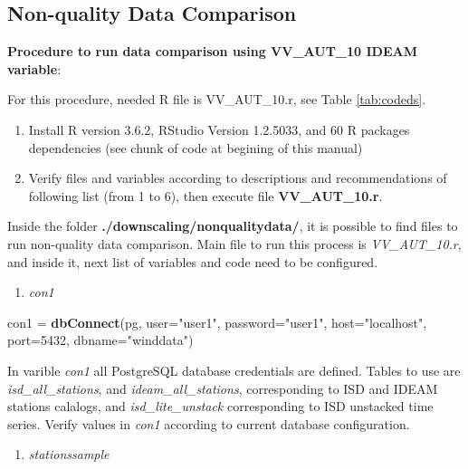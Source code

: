\documentclass[12pt,oneside]{reedthesis}
\newenvironment{Shaded}{\begin{snugshade}}{\end{snugshade}}
\newcommand{\DataTypeTok}[1]{\textcolor[rgb]{0.13,0.29,0.53}{#1}}
\newcommand{\DecValTok}[1]{\textcolor[rgb]{0.00,0.00,0.81}{#1}}
\newcommand{\KeywordTok}[1]{\textcolor[rgb]{0.13,0.29,0.53}{\textbf{#1}}}
\newcommand{\NormalTok}[1]{#1}
\newcommand{\StringTok}[1]{\textcolor[rgb]{0.31,0.60,0.02}{#1}}
\providecommand{\tightlist}{%
  \setlength{\itemsep}{0pt}\setlength{\parskip}{0pt}}
\begin{document}
\hypertarget{non-quality-data-comparison}{%
\subsection{Non-quality Data Comparison}\label{non-quality-data-comparison}}

\textbf{Procedure to run data comparison using VV\_AUT\_10 IDEAM variable}:

For this procedure, needed R file is VV\_AUT\_10.r, see Table \ref{tab:codeds}.
\begin{enumerate}
\def\labelenumi{\arabic{enumi}.}
\item
  Install R version 3.6.2, RStudio Version 1.2.5033, and 60 R packages dependencies (see chunk of code at begining of this manual)
\item
  Verify files and variables according to descriptions and recommendations of following list (from 1 to 6), then execute file \textbf{VV\_AUT\_10.r}.
\end{enumerate}
Inside the folder \textbf{./downscaling/nonqualitydata/}, it is possible to find files to run non-quality data comparison. Main file to run this process is \emph{VV\_AUT\_10.r}, and inside it, next list of variables and code need to be configured.
\begin{enumerate}
\def\labelenumi{\arabic{enumi}.}
\tightlist
\item
  \emph{con1}
\end{enumerate}
\scriptsize

\vspace{0.4cm}
\begin{Shaded}
\begin{Highlighting}[]
\NormalTok{      con1 =}\StringTok{ }\KeywordTok{dbConnect}\NormalTok{(pg, }\DataTypeTok{user=}\StringTok{"user1"}\NormalTok{, }\DataTypeTok{password=}\StringTok{"user1"}\NormalTok{, }\DataTypeTok{host=}\StringTok{"localhost"}\NormalTok{, }\DataTypeTok{port=}\DecValTok{5432}\NormalTok{, }\DataTypeTok{dbname=}\StringTok{"winddata"}\NormalTok{)}
\end{Highlighting}
\end{Shaded}
\normalsize

In varible \emph{con1} all PostgreSQL database credentials are defined. Tables to use are \emph{isd\_all\_stations}, and \emph{ideam\_all\_stations}, corresponding to ISD and IDEAM stations calalogs, and \emph{isd\_lite\_unstack} corresponding to ISD unstacked time series. Verify values in \emph{con1} according to current database configuration.
\begin{enumerate}
\def\labelenumi{\arabic{enumi}.}
\setcounter{enumi}{1}
\tightlist
\item
  \emph{stationssample}
\end{enumerate}
\scriptsize
\end{document}
